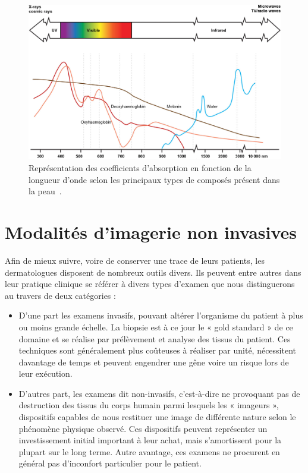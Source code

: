 \begin{figure}[H]
    \centering
    \includegraphics[width=\linewidth]{contents/chapter_2/resources/scheme_light_absorption.png}
    \caption{Représentation des coefficients d'absorption en fonction de la longueur d'onde selon les principaux types de composés présent dans la peau~\cite{Stewart2013}.}
    \label{fig:scheme_light_absorption}
\end{figure}
 
\clearpage
\section{Modalités d’imagerie non invasives}
Afin de mieux suivre, voire de conserver une trace de leurs patients, les dermatologues disposent de nombreux outils divers. Ils peuvent entre autres dans leur pratique clinique se référer à divers types d’examen que nous distinguerons au travers de deux catégories :
\begin{itemize}
\item D’une part les examens invasifs, pouvant altérer l’organisme du patient à plus ou moins grande échelle. La biopsie est à ce jour le « gold standard » de ce domaine et se réalise par prélèvement et analyse des tissus du patient. Ces techniques sont généralement plus coûteuses à réaliser par unité, nécessitent davantage de temps et peuvent engendrer une gêne voire un risque lors de leur exécution.
\item D’autres part, les examens dit non-invasifs, c’est-à-dire ne provoquant pas de destruction des tissus du corps humain parmi lesquels les « imageurs », dispositifs capables de nous restituer une image de différente nature selon le phénomène physique observé. Ces dispositifs peuvent représenter un investissement initial important à leur achat, mais s'amortissent pour la plupart sur le long terme. Autre avantage, ces examens ne procurent en général pas d’inconfort particulier pour le patient.
\end{itemize}\par

